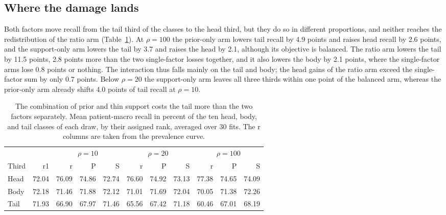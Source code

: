 \subsection{Where the damage lands}
\label{sec:rank-results}
Both factors move recall from the tail third of the classes to the head third, but they do so in different proportions, and neither reaches the redistribution of the ratio arm (Table~\ref{tab:thirds}). At $\rho=100$ the prior-only arm lowers tail recall by 4.9 points and raises head recall by 2.6 points, and the support-only arm lowers the tail by 3.7 and raises the head by 2.1, although its objective is balanced. The ratio arm lowers the tail by 11.5 points, 2.8 points more than the two single-factor losses together, and it also lowers the body by 2.1 points, where the single-factor arms lose 0.8 points or nothing. The interaction thus falls mainly on the tail and body; the head gains of the ratio arm exceed the single-factor sum by only 0.7 points. Below $\rho=20$ the support-only arm leaves all three thirds within one point of the balanced arm, whereas the prior-only arm already shifts 4.0 points of tail recall at $\rho=10$.

\begin{table}[htbp]
\centering
\small
\renewcommand{\arraystretch}{1.15}
\begin{tabular}{@{}lrrrrrrrrrr@{}}
\toprule
 & & \multicolumn{3}{c}{$\rho=10$} & \multicolumn{3}{c}{$\rho=20$} & \multicolumn{3}{c}{$\rho=100$} \\
\cmidrule(lr){3-5}\cmidrule(lr){6-8}\cmidrule(lr){9-11}
Third & r1 & r & P & S & r & P & S & r & P & S \\
\midrule
Head & 72.04 & 76.09 & 74.86 & 72.74 & 76.60 & 74.92 & 73.13 & 77.38 & 74.65 & 74.09 \\
Body & 72.18 & 71.46 & 71.88 & 72.12 & 71.01 & 71.69 & 72.04 & 70.05 & 71.38 & 72.26 \\
Tail & 71.93 & 66.90 & 67.97 & 71.46 & 65.56 & 67.42 & 71.18 & 60.46 & 67.01 & 68.19 \\
\bottomrule
\end{tabular}
\caption{The combination of prior and thin support costs the tail more than the two factors separately. Mean patient-macro recall in percent of the ten head, body, and tail classes of each draw, by their assigned rank, averaged over 30 fits. The r columns are taken from the prevalence curve.}
\label{tab:thirds}
\end{table}

